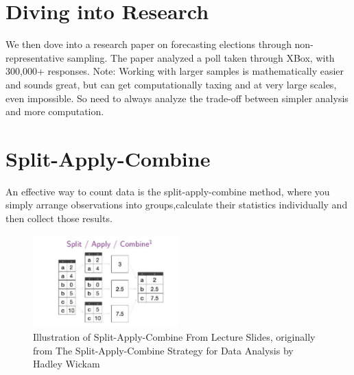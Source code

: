 \section{Diving into Research}
We then dove into a research paper on forecasting elections through non-representative sampling. The paper analyzed a poll taken through XBox, with 300,000+ responses.
Note: Working with larger samples is mathematically easier and sounds great, but can get computationally taxing and at very large scales, even impossible. So need to always analyze the trade-off between simpler analysis and more computation.

\section{Split-Apply-Combine}
An effective way to count data is the split-apply-combine method, where you simply arrange observations into groups,calculate their statistics individually and then collect those results.
\begin{figure}[ht]
  \begin{center}
    \includegraphics[width=0.5\textwidth]{figures/sac.png}
    \caption{
      Illustration of Split-Apply-Combine 
      From Lecture Slides, originally from The Split-Apply-Combine Strategy for Data Analysis by Hadley Wickam
      }
    \label{fig:example_figure}
  \end{center}
\end{figure}

